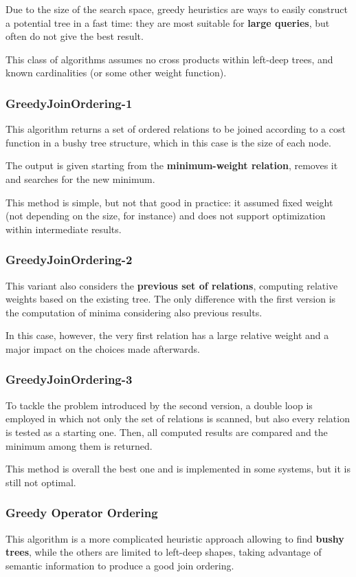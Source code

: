 Due to the size of the search space, greedy heuristics are ways to easily construct a potential tree in a fast time: they are most suitable for \textbf{large queries}, but often do not give the best result.

This class of algorithms assumes no cross products within left-deep trees, and known cardinalities (or some other weight function).

\subsubsection{GreedyJoinOrdering-1}
This algorithm returns a set of ordered relations to be joined according to a cost function in a bushy tree structure, which in this case is the size of each node. 

The output is given starting from the \textbf{minimum-weight relation}, removes it and searches for the new minimum. 

This method is simple, but not that good in practice: it assumed fixed weight (not depending on the size, for instance) and does not support optimization within intermediate results. 

\subsubsection{GreedyJoinOrdering-2}
This variant also considers the \textbf{previous set of relations}, computing relative weights based on the existing tree. The only difference with the first version is the computation of minima considering also previous results.

In this case, however, the very first relation has a large relative weight and a major impact on the choices made afterwards. 

\subsubsection{GreedyJoinOrdering-3}
To tackle the problem introduced by the second version, a double loop is employed in which not only the set of relations is scanned, but also every relation is tested as a starting one. Then, all computed results are compared and the minimum among them is returned. 

This method is overall the best one and is implemented in some systems, but it is still not optimal.

\subsubsection{Greedy Operator Ordering}
This algorithm is a more complicated heuristic approach allowing to find \textbf{bushy trees}, while the others are limited to left-deep shapes, taking advantage of semantic information to produce a good join ordering.


